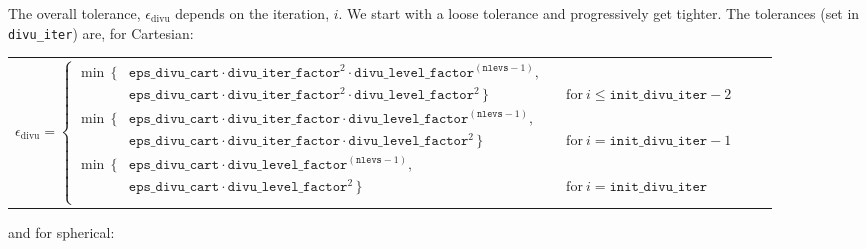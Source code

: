 \begin{itemize}
  The overall tolerance, $\epsilon_\mathrm{divu}$ depends on the iteration, $i$.
  We start with a loose tolerance and progressively get tighter.  The
  tolerances (set in {\tt divu\_iter}) are, for Cartesian:
  {\small
   \begin{center}
   \begin{tabular}{lll}
   $\epsilon_\mathrm{divu} = \left  \{ \begin{array}{lll} 
                   \min\, \{& \!\!\!\mathtt{eps\_divu\_cart} \cdot \mathtt{divu\_iter\_factor}^2 \cdot \mathtt{divu\_level\_factor}^{(\mathtt{nlevs}-1)}, \\
                            & \!\!\!\mathtt{eps\_divu\_cart} \cdot \mathtt{divu\_iter\_factor}^2 \cdot \mathtt{divu\_level\_factor}^2 \, \} & 
                           \quad \mathrm{for}~ i \le \mathtt{init\_divu\_iter} - 2 \\[2mm]
                   \min\, \{& \!\!\!\mathtt{eps\_divu\_cart} \cdot \mathtt{divu\_iter\_factor} \cdot \mathtt{divu\_level\_factor}^{(\mathtt{nlevs}-1)}, \\
                            & \!\!\!\mathtt{eps\_divu\_cart} \cdot \mathtt{divu\_iter\_factor} \cdot \mathtt{divu\_level\_factor}^2 \, \} & 
                           \quad \mathrm{for}~ i = \mathtt{init\_divu\_iter} - 1  \\[2mm]
                   \min\, \{& \!\!\!\mathtt{eps\_divu\_cart} \cdot \mathtt{divu\_level\_factor}^{(\mathtt{nlevs}-1)}, \\
                            & \!\!\!\mathtt{eps\_divu\_cart} \cdot \mathtt{divu\_level\_factor}^2 \, \} & 
                           \quad \mathrm{for}~ i = \mathtt{init\_divu\_iter}   \\
                                 \end{array}
                  \right .$ \\[10mm]
   \end{tabular}
   \end{center}
   }
   and for spherical:
   {\small 
   \begin{center}
\end{center}}
\end{itemize}
